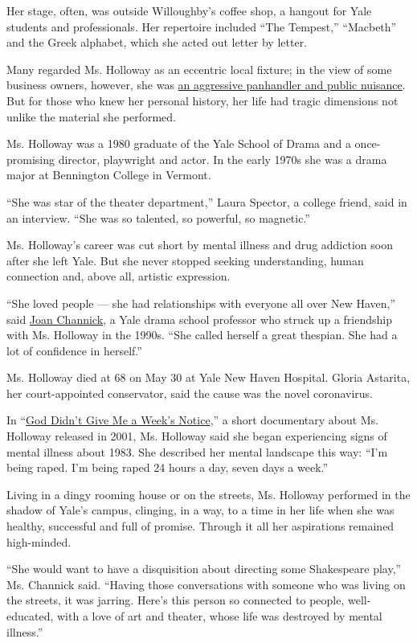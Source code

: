 Her stage, often, was outside Willoughby's coffee shop, a hangout for
Yale students and professionals. Her repertoire included ``The
Tempest,'' ``Macbeth'' and the Greek alphabet, which she acted out
letter by letter.

Many regarded Ms. Holloway as an eccentric local fixture; in the view of
some business owners, however, she was
\href{https://www.nytimes.com/2004/12/19/nyregion/a-resurgent-downtown-wearies-of-a-street-poets-antic-disposition.html}{an
aggressive panhandler and public nuisance}. But for those who knew her
personal history, her life had tragic dimensions not unlike the material
she performed.

Ms. Holloway was a 1980 graduate of the Yale School of Drama and a
once-promising director, playwright and actor. In the early 1970s she
was a drama major at Bennington College in Vermont.

``She was star of the theater department,'' Laura Spector, a college
friend, said in an interview. ``She was so talented, so powerful, so
magnetic.''

Ms. Holloway's career was cut short by mental illness and drug addiction
soon after she left Yale. But she never stopped seeking understanding,
human connection and, above all, artistic expression.

``She loved people --- she had relationships with everyone all over New
Haven,'' said \href{https://www.drama.yale.edu/bios/joan-channick/}{Joan
Channick}, a Yale drama school professor who struck up a friendship with
Ms. Holloway in the 1990s. ``She called herself a great thespian. She
had a lot of confidence in herself.''

Ms. Holloway died at 68 on May 30 at Yale New Haven Hospital. Gloria
Astarita, her court-appointed conservator, said the cause was the novel
coronavirus.

In ``\href{http://www.afterart.com/holloway.html}{God Didn't Give Me a
Week's Notice},'' a short documentary about Ms. Holloway released in
2001, Ms. Holloway said she began experiencing signs of mental illness
about 1983. She described her mental landscape this way: ``I'm being
raped. I'm being raped 24 hours a day, seven days a week.''

Living in a dingy rooming house or on the streets, Ms. Holloway
performed in the shadow of Yale's campus, clinging, in a way, to a time
in her life when she was healthy, successful and full of promise.
Through it all her aspirations remained high-minded.

``She would want to have a disquisition about directing some Shakespeare
play,'' Ms. Channick said. ``Having those conversations with someone who
was living on the streets, it was jarring. Here's this person so
connected to people, well-educated, with a love of art and theater,
whose life was destroyed by mental illness.''

